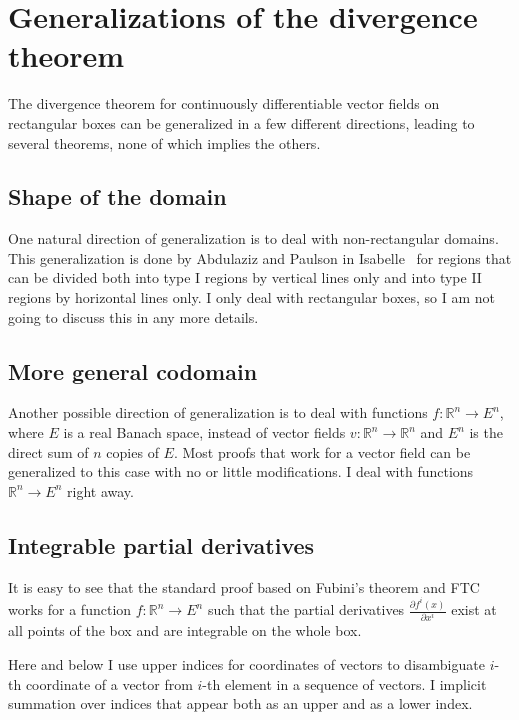 \documentclass[a4paper, UKenglish,cleveref, autoref, thm-restate]{lipics-v2021}
\newcommand{\bbR}{\mathbb{R}}
\begin{document}
\section{Generalizations of the divergence theorem}%
\label{sec:gener-diverg-theor}

The divergence theorem for continuously differentiable vector fields
on rectangular boxes can be generalized in a few different directions,
leading to several theorems, none of which implies the others.

\subsection{Shape of the domain}
One natural direction of generalization is to deal with
non-rectangular domains. This generalization is done by Abdulaziz and
Paulson in Isabelle~\cite{Abdulaziz_Paulson} for regions that can be
divided both into type I regions by vertical lines only and into type
II regions by horizontal lines only. I only deal with rectangular
boxes, so I am not going to discuss this in any more details.


\subsection{More general codomain}
Another possible direction of generalization is to deal with functions
\(f\colon \bbR^{n}\to E^{n}\), where \(E\) is a real Banach space,
instead of vector fields \(v\colon \bbR^{n}\to\bbR^{n}\) and \(E^{n}\)
is the direct sum of \(n\) copies of \(E\). Most proofs that work for
a vector field can be generalized to this case with no or little
modifications. I deal with functions \(\bbR^{n}\to E^{n}\) right away.

\subsection{Integrable partial derivatives}
It is easy to see that the standard proof based on Fubini's theorem
and FTC works for a function \(f\colon \bbR^{n}\to E^{n}\) such that
the partial derivatives \(\frac{\partial f^{i}(x)}{\partial x^{i}}\)
exist at all points of the box and are integrable on the whole
box.

\begin{remark}
  Here and below I use upper indices for coordinates of vectors to
  disambiguate \(i\)-th coordinate of a vector from \(i\)-th element
  in a sequence of vectors. I  implicit
  summation over indices that appear both as an upper and as a lower
  index.
\end{remark}
\end{document}
